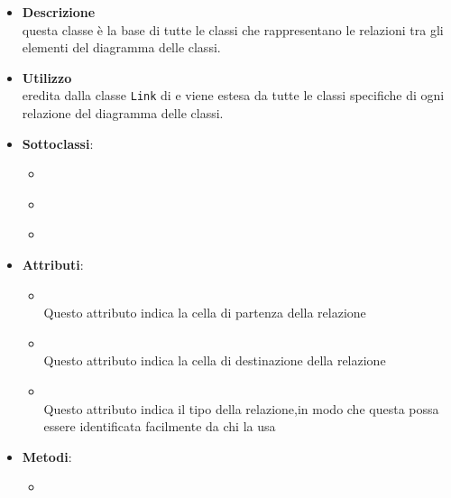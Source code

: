 \label{\nogloxy{swedesigner::client::model::celltypes::class::ClassDiagramLink}}
\begin{figure}[h]
\centering
{}
\caption{}
\end{figure}
\FloatBarrier
\begin{itemize}
\item \textbf{Descrizione}\\
questa classe è la base di tutte le classi che rappresentano le relazioni tra gli elementi del diagramma delle classi.
\item \textbf{Utilizzo}\\
eredita dalla classe \texttt{Link} di \jointjs{} e viene estesa da tutte le classi specifiche di ogni relazione del diagramma delle classi.
\item \textbf{Sottoclassi}:
\begin{itemize}
\item \hyperref[\nogloxy{swedesigner::client::model::celltypes::class::HxAssociation}]{}
\item \hyperref[\nogloxy{swedesigner::client::model::celltypes::class::HxGeneralization}]{}
\item \hyperref[\nogloxy{swedesigner::client::model::celltypes::class::HxImplementation}]{}
\end{itemize}
\item \textbf{Attributi}:
\begin{itemize}
\item {}
\\ Questo attributo indica la cella di partenza della relazione
\item {}
\\ Questo attributo indica la cella di destinazione della relazione
\item {}
\\ Questo attributo indica il tipo della relazione,in modo che questa possa essere identificata facilmente da chi la usa
\end{itemize}
\item \textbf{Metodi}:
\begin{itemize}
\item {}

\end{itemize}
\end{itemize}
